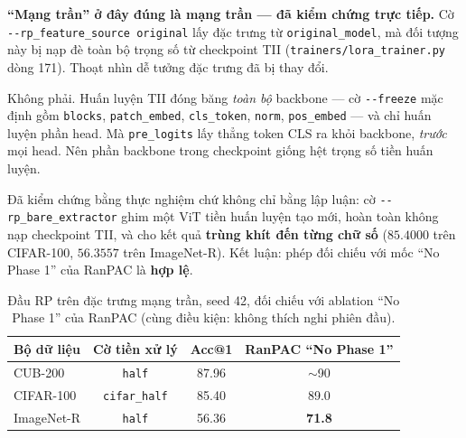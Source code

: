 \documentclass[11pt,a4paper]{article}
\newenvironment{luuy}{\begin{leftbar}\noindent\ignorespaces}{\end{leftbar}}
\begin{document}
\begin{luuy}
\textbf{``Mạng trần'' ở đây đúng là mạng trần --- đã kiểm chứng trực tiếp.}
Cờ \texttt{-{}-rp\_feature\_source original} lấy đặc trưng từ
\texttt{original\_model}, mà đối tượng này bị nạp đè toàn bộ trọng số từ
checkpoint TII (\texttt{trainers/lora\_trainer.py} dòng 171). Thoạt nhìn dễ tưởng
đặc trưng đã bị thay đổi.

Không phải. Huấn luyện TII đóng băng \emph{toàn bộ} backbone --- cờ
\texttt{-{}-freeze} mặc định gồm \texttt{blocks}, \texttt{patch\_embed},
\texttt{cls\_token}, \texttt{norm}, \texttt{pos\_embed} --- và chỉ huấn luyện
phần head. Mà \texttt{pre\_logits} lấy thẳng token CLS ra khỏi backbone,
\emph{trước} mọi head. Nên phần backbone trong checkpoint giống hệt trọng số tiền
huấn luyện.

Đã kiểm chứng bằng thực nghiệm chứ không chỉ bằng lập luận: cờ
\texttt{-{}-rp\_bare\_extractor} ghim một ViT tiền huấn luyện tạo mới, hoàn toàn
không nạp checkpoint TII, và cho kết quả \textbf{trùng khít đến từng chữ số}
($85.4000$ trên CIFAR-100, $56.3557$ trên ImageNet-R). Kết luận: phép đối chiếu
với mốc ``No Phase 1'' của RanPAC là \textbf{hợp lệ}.
\end{luuy}

\begin{table}[htbp]
\centering
\caption{Đầu RP trên đặc trưng mạng trần, seed 42, đối chiếu với ablation ``No
Phase 1'' của RanPAC (cùng điều kiện: không thích nghi phiên đầu).}
\label{tab:chan-doan-dong-bang}
\begin{tabular}{@{}lccc@{}}
\toprule
Bộ dữ liệu & Cờ tiền xử lý & Acc@1 & RanPAC ``No Phase 1'' \\
\midrule
CUB-200    & \texttt{half}        & 87.96 & $\sim$90 \\
CIFAR-100  & \texttt{cifar\_half} & 85.40 & 89.0 \\
ImageNet-R & \texttt{half}        & 56.36 & \textbf{71.8} \\
\bottomrule
\end{tabular}
\end{table}
\end{document}
